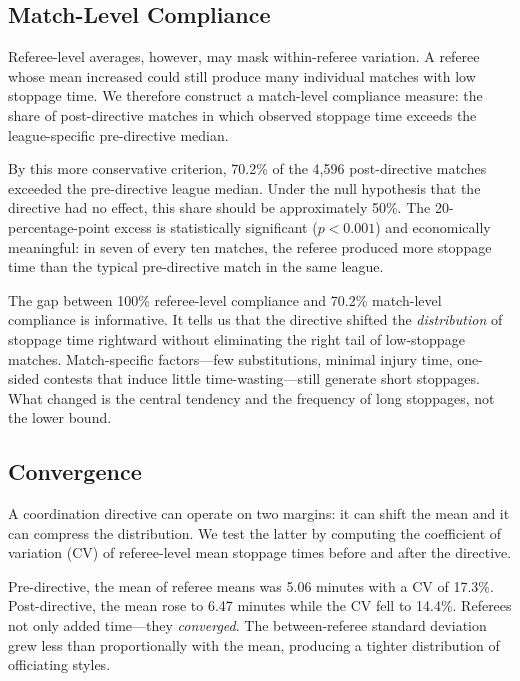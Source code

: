 \subsection{Match-Level Compliance}
\label{sec:match_level_compliance}

Referee-level averages, however, may mask within-referee variation.  A referee whose mean increased could still produce many individual matches with low stoppage time.  We therefore construct a match-level compliance measure: the share of post-directive matches in which observed stoppage time exceeds the league-specific pre-directive median.

By this more conservative criterion, 70.2\% of the 4,596 post-directive matches exceeded the pre-directive league median.  Under the null hypothesis that the directive had no effect, this share should be approximately 50\%.  The 20-percentage-point excess is statistically significant ($p < 0.001$) and economically meaningful: in seven of every ten matches, the referee produced more stoppage time than the typical pre-directive match in the same league.

The gap between 100\% referee-level compliance and 70.2\% match-level compliance is informative.  It tells us that the directive shifted the \emph{distribution} of stoppage time rightward without eliminating the right tail of low-stoppage matches.  Match-specific factors---few substitutions, minimal injury time, one-sided contests that induce little time-wasting---still generate short stoppages.  What changed is the central tendency and the frequency of long stoppages, not the lower bound.

\subsection{Convergence}
\label{sec:convergence}

A coordination directive can operate on two margins: it can shift the mean and it can compress the distribution.  We test the latter by computing the coefficient of variation (CV) of referee-level mean stoppage times before and after the directive.

Pre-directive, the mean of referee means was 5.06 minutes with a CV of 17.3\%.  Post-directive, the mean rose to 6.47 minutes while the CV fell to 14.4\%.  Referees not only added time---they \emph{converged}.  The between-referee standard deviation grew less than proportionally with the mean, producing a tighter distribution of officiating styles.

